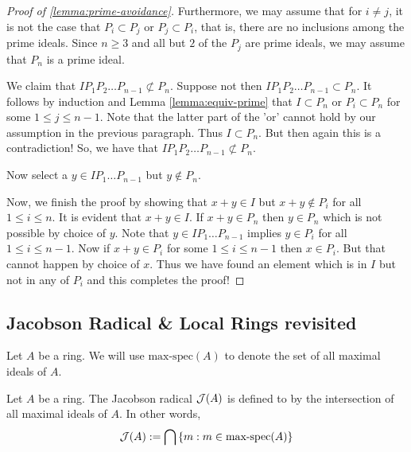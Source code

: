 \begin{proof}[Proof of \ref{lemma:prime-avoidance}]
    Furthermore, we may assume that for $i\ne j$, it is not the case that $P_i \subset P_j$ or $P_j \subset P_i$, that is, there are no inclusions among the prime ideals. Since $n\ge 3$ and all but $2$ of the $P_j$ are prime ideals, we may assume that $P_n$ is a prime ideal.
    
    We claim that $IP_1 P_2 \ldots P_{n-1} \not\subset P_n$. Suppose not then $I P_1 P_2 \ldots P_{n-1} \subset P_n$. It follows by induction and Lemma \ref{lemma:equiv-prime} that $I \subset P_n$ or $P_i \subset P_n$ for some $1\le j \le n-1$. Note that the latter part of the 'or' cannot hold by our assumption in the previous paragraph. Thus $I \subset P_n$. But then again this is a contradiction! So, we have that $IP_1 P_2 \ldots P_{n-1} \not\subset P_n$.

    Now select a $y\in IP_1 \ldots P_{n-1}$ but $y\not \in P_n$.

    Now, we finish the proof by showing that $x+y \in I$ but $x+y \not \in P_i$ for all $1\le i \le n$. It is evident that $x+y \in I$. If $x+y\in P_n$ then $y\in P_n$ which is not possible by choice of $y$. Note that $y\in IP_1\ldots P_{n-1}$ implies $y\in P_i$ for all $1\le i\le n-1$. Now if $x+y \in P_i$ for some $1\le i \le n-1$ then $x \in P_i$. But that cannot happen by choice of $x$. Thus we have found an element which is in $I$ but not in any of $P_i$ and this completes the proof!

\end{proof}

\subsection{Jacobson Radical \& Local Rings revisited}

\begin{notation}
    Let $A$ be a ring. We will use $\text{max-spec} (A)$ to denote the set of all maximal ideals of $A$.
\end{notation}


\begin{definition}
    Let $A$ be a ring. The Jacobson radical ${\cal J} (A)$ is defined to by the intersection of all maximal ideals of $A$. In other words,
    \begin{equation*}
	{\cal J} (A) := \bigcap \left\{ m : m \in \text{max-spec} (A) \right\}
    \end{equation*}
    \label{def:Jacobson}
\end{definition}

